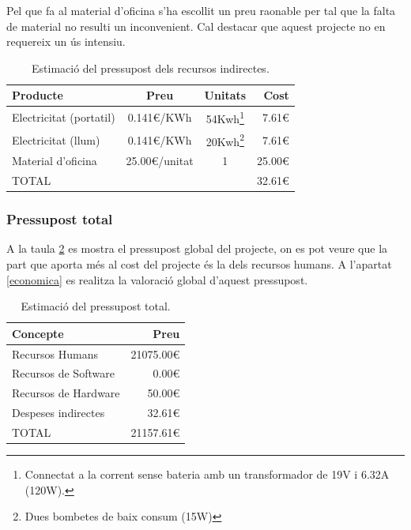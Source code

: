 \documentclass[10pt,a4paper]{article}
\begin{document}
Pel que fa al material d'oficina s'ha escollit un preu raonable per tal que la falta de material no resulti un inconvenient. Cal destacar que aquest projecte no en requereix un ús intensiu.

\begin{table}[!htb]
    \centering
    \begin{tabular}{|l||c|c|r|}
        \hline
         Producte & Preu & Unitats & Cost \\
         \hline\hline
         Electricitat (portatil) & 0.141€/KWh & 54Kwh\footnote{Connectat a la corrent sense bateria amb un transformador de 19V i 6.32A (120W).} & 7.61€\\
         \hline\hline
         Electricitat (llum) & 0.141€/KWh & 20Kwh\footnote{Dues bombetes de baix consum (15W)} & 7.61€\\
         \hline\hline
         Material d'oficina & 25.00€/unitat & 1 & 25.00€ \\
         \hline\hline
         TOTAL & & & 32.61€ \\
         \hline
    \end{tabular}
    \caption{Estimació del pressupost dels recursos indirectes.}
    \label{tab:recursos_indirectes}
\end{table}


\subsubsection{Pressupost total}

A la taula \ref{tab:total} es mostra el pressupost global del projecte, on es pot veure que la part que aporta més al cost del projecte és la dels recursos humans. A l'apartat \ref{economica} es realitza la valoració global d'aquest pressupost.

\begin{table}[!htb]
    \centering
    \begin{tabular}{|l|r|}
        \hline
         Concepte & Preu \\
         \hline\hline
         Recursos Humans & 21075.00€ \\
         Recursos de Software & 0.00€ \\
         Recursos de Hardware & 50.00€ \\
         Despeses indirectes & 32.61€ \\
         \hline\hline
         TOTAL & 21157.61€ \\
         \hline
    \end{tabular}
    \caption{Estimació del pressupost total.}
    \label{tab:total}
\end{table}
\end{document}
